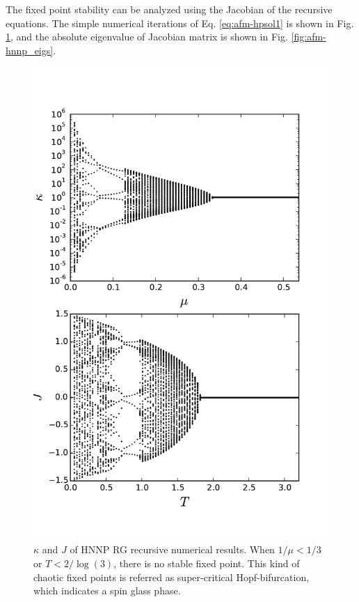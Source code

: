 The fixed point stability can be analyzed using the Jacobian of the recursive equations.
The simple numerical iterations of Eq. \ref{eq:afm-hpsol1} is shown in Fig. \ref{fig:afm-hnnpkappa}, and the absolute eigenvalue of Jacobian matrix is shown in Fig. \ref{fig:afm-hnnp_eigs}.
\begin{figure}
\centering \includegraphics[width=0.6\columnwidth]{Chapter-3/HNNP_RG_Kvsmu_JvsT.pdf}
\protect\caption{ $\kappa$ and $J$ of HNNP RG recursive numerical results. When $1/\mu < 1/3$ or $T < 2/\log(3)$, there is no stable fixed point. This kind of chaotic fixed points is referred as super-critical Hopf-bifurcation, which indicates a spin glass phase.}
\label{fig:afm-hnnpkappa} 
\end{figure}


